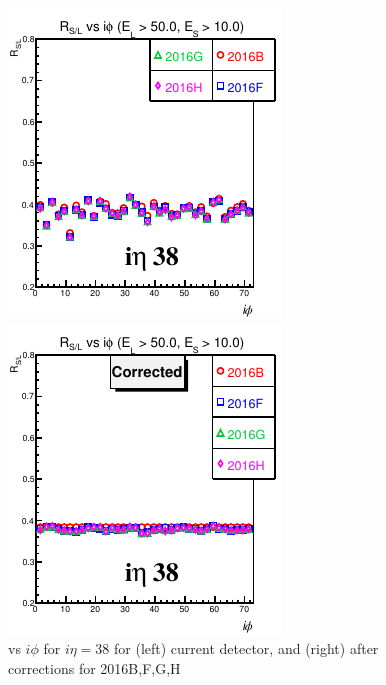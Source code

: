 \begin{figure}[!h] %
\begin{minipage}[c]{0.5\linewidth}
\centering
\includegraphics[width=0.7\linewidth]{../Figures/Chap2/ImageFiles_HF/Ratio/2016/Corrected/ieta38Cut3Ietaiphi.pdf}
\end{minipage}
\begin{minipage}[c]{0.5\linewidth}
\centering
\includegraphics[width=0.7\linewidth]{../Figures/Chap2/ImageFiles_HF/Ratio/2016/Corrected/ieta38Cut3Ietaiphi_corr.pdf}
\end{minipage}
\caption{\ratiosl vs $i\phi$ for $i\eta=$38 for (left) current detector, and (right) after corrections for 2016B,F,G,H}
\label{corrected2016BFGH_38}
\end{figure}

